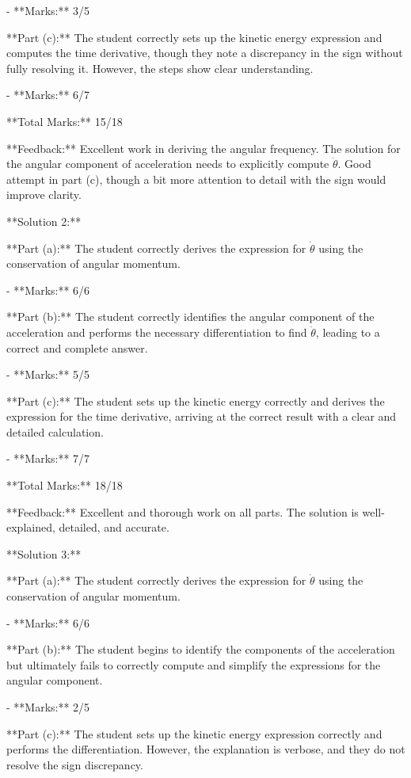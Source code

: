 \documentclass[a4paper,11pt]{article}
\begin{document}
- **Marks:** 3/5

**Part (c):** The student correctly sets up the kinetic energy expression and computes the time derivative, though they note a discrepancy in the sign without fully resolving it. However, the steps show clear understanding.

- **Marks:** 6/7

**Total Marks:** 15/18

**Feedback:** Excellent work in deriving the angular frequency. The solution for the angular component of acceleration needs to explicitly compute \( \ddot{\theta} \). Good attempt in part (c), though a bit more attention to detail with the sign would improve clarity.

**Solution 2:**

**Part (a):** The student correctly derives the expression for \( \dot{\theta} \) using the conservation of angular momentum.

- **Marks:** 6/6

**Part (b):** The student correctly identifies the angular component of the acceleration and performs the necessary differentiation to find \( \ddot{\theta} \), leading to a correct and complete answer.

- **Marks:** 5/5

**Part (c):** The student sets up the kinetic energy correctly and derives the expression for the time derivative, arriving at the correct result with a clear and detailed calculation.

- **Marks:** 7/7

**Total Marks:** 18/18

**Feedback:** Excellent and thorough work on all parts. The solution is well-explained, detailed, and accurate.

**Solution 3:**

**Part (a):** The student correctly derives the expression for \( \dot{\theta} \) using the conservation of angular momentum.

- **Marks:** 6/6

**Part (b):** The student begins to identify the components of the acceleration but ultimately fails to correctly compute and simplify the expressions for the angular component.

- **Marks:** 2/5

**Part (c):** The student sets up the kinetic energy expression correctly and performs the differentiation. However, the explanation is verbose, and they do not resolve the sign discrepancy.
\end{document}
